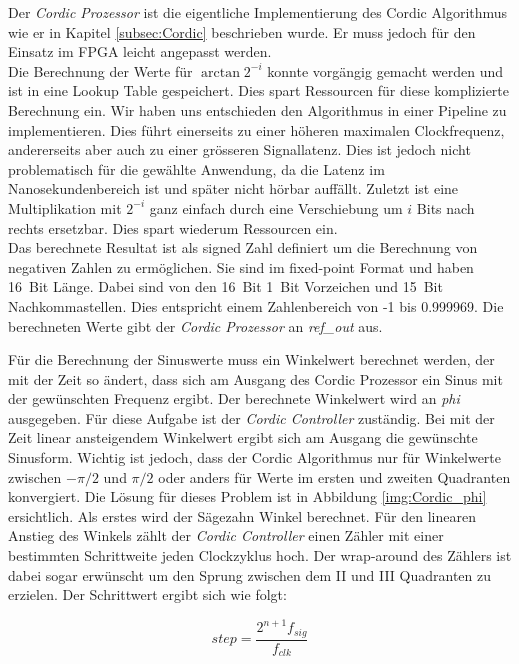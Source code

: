 Der \textit{Cordic Prozessor} ist die eigentliche Implementierung des Cordic Algorithmus wie er in Kapitel \ref{subsec:Cordic} beschrieben wurde. Er muss jedoch für den Einsatz im FPGA leicht angepasst werden. \\
Die Berechnung der Werte für \(\arctan{2^{-i}}\) konnte vorgängig gemacht werden und ist in eine Lookup Table gespeichert. Dies spart Ressourcen für diese komplizierte Berechnung ein. Wir haben uns entschieden den Algorithmus in einer Pipeline zu implementieren. Dies führt einerseits zu einer höheren maximalen Clockfrequenz, andererseits aber auch zu einer grösseren Signallatenz. Dies ist jedoch nicht problematisch für die gewählte Anwendung, da die Latenz im Nanosekundenbereich ist und später nicht hörbar auffällt. Zuletzt ist eine Multiplikation mit \(2^{-i}\) ganz einfach durch eine Verschiebung um \(i\) Bits nach rechts ersetzbar. Dies spart wiederum Ressourcen ein.\\
Das berechnete Resultat ist als signed Zahl definiert um die Berechnung von negativen Zahlen zu ermöglichen. Sie sind im fixed-point Format und haben \SI{16}{Bit} Länge. Dabei sind von den \SI{16}{Bit} \SI{1}{Bit} Vorzeichen und \SI{15}{Bit} Nachkommastellen. Dies entspricht einem Zahlenbereich von -1 bis 0.999969. Die berechneten Werte gibt der \textit{Cordic Prozessor} an \textit{ref\_out} aus.

Für die Berechnung der Sinuswerte muss ein Winkelwert berechnet werden, der mit der Zeit so ändert, dass sich am Ausgang des Cordic Prozessor ein Sinus mit der gewünschten Frequenz ergibt. Der berechnete Winkelwert wird an \textit{phi} ausgegeben. Für diese Aufgabe ist der \textit{Cordic Controller} zuständig. Bei mit der Zeit linear ansteigendem Winkelwert ergibt sich am Ausgang die gewünschte Sinusform. Wichtig ist jedoch, dass der Cordic Algorithmus nur für Winkelwerte zwischen \(-\pi/2\) und \(\pi/2\) oder anders für Werte im ersten und zweiten Quadranten konvergiert. Die Lösung für dieses Problem ist in Abbildung \ref{img:Cordic_phi} ersichtlich. 
Als erstes wird der Sägezahn Winkel berechnet. Für den linearen Anstieg des Winkels zählt der \textit{Cordic Controller} einen Zähler mit einer bestimmten Schrittweite jeden Clockzyklus hoch. Der wrap-around des Zählers ist dabei sogar erwünscht um den Sprung zwischen dem II und III Quadranten zu erzielen. Der Schrittwert ergibt sich wie folgt:

\begin{equation}
step = \frac{2^{n+1}f_{sig}}{f_{clk}}
\label{equ:cordic_3}
\end{equation} 

